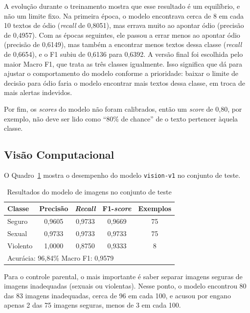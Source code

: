 \documentclass[
    12pt,           %
    oneside,        %
    a4paper,        %
    chapter=TITLE,  %
    english,        %
    brazil          %
]{abntex2}
\begin{document}
A evolução durante o treinamento mostra que esse resultado é um equilíbrio, e
não um limite fixo. Na primeira época, o modelo encontrava cerca de 8 em cada
10 textos de ódio (\textit{recall} de 0,8051), mas errava muito ao apontar
ódio (precisão de 0,4957). Com as épocas seguintes, ele passou a errar menos
ao apontar ódio (precisão de 0,6149), mas também a encontrar menos textos
dessa classe (\textit{recall} de 0,6654), e o F1 subiu de 0,6136 para 0,6392.
A versão final foi escolhida pelo maior Macro F1, que trata as três classes
igualmente. Isso significa que dá para ajustar o comportamento do modelo
conforme a prioridade: baixar o limite de decisão para ódio faria o modelo
encontrar mais textos dessa classe, em troca de mais alertas indevidos.

Por fim, os \textit{scores} do modelo não foram calibrados, então um
\textit{score} de 0,80, por exemplo, não deve ser lido como ``80\% de chance''
de o texto pertencer àquela classe.
\subsection{Visão Computacional}

O Quadro~\ref{tab:resultados-imagem} mostra o desempenho do modelo
\texttt{vision-v1} no conjunto de teste.
\begin{table}[htbp]
\centering
\small
\renewcommand{\arraystretch}{1.3}
\begin{tabular}{|l|c|c|c|c|}
\hline
\textbf{Classe} & \textbf{Precisão} & \textbf{\textit{Recall}} & \textbf{F1-\textit{score}} & \textbf{Exemplos} \\ \hline
Seguro & 0,9605 & 0,9733 & 0,9669 & 75 \\ \hline
Sexual & 0,9733 & 0,9733 & 0,9733 & 75 \\ \hline
Violento & 1,0000 & 0,8750 & 0,9333 & 8 \\ \hline
\multicolumn{5}{|l|}{Acurácia: 96,84\% \quad Macro F1: 0,9579} \\ \hline
\end{tabular}
\caption{Resultados do modelo de imagens no conjunto de teste}
\label{tab:resultados-imagem}
\end{table}

Para o controle parental, o mais importante é saber separar imagens seguras
de imagens inadequadas (sexuais ou violentas). Nesse ponto, o modelo
encontrou 80 das 83 imagens inadequadas, cerca de 96 em cada 100, e acusou
por engano apenas 2 das 75 imagens seguras, menos de 3 em cada 100.
\end{document}
